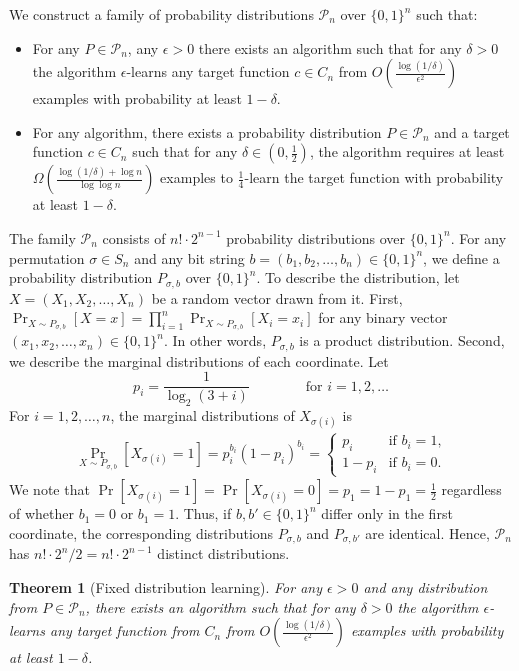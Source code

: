 \documentclass[12pt]{article}
\newtheorem{theorem}[proposition]{Theorem}
\renewcommand{\P}{\mathcal{P}}
\begin{document}
We construct a family of probability distributions $\P_n$ over $\{0,1\}^n$ such that:
\begin{itemize}
\item For any $P \in \P_n$, any $\epsilon > 0$ there exists an algorithm such
that for any $\delta > 0$ the algorithm $\epsilon$-learns any target function $c
\in C_n$ from $O \left( \frac{\log(1/\delta)}{\epsilon^2} \right)$ examples with
probability at least $1-\delta$.

\item For any algorithm, there exists
a probability distribution $P \in \P_n$ and a target function $c \in C_n$
such that for any $\delta \in (0,\frac{1}{2})$, the algorithm requires
at least $\Omega(\frac{\log(1/\delta) + \log n}{\log \log n})$ examples to
$\frac{1}{4}$-learn the target function with probability at least $1-\delta$.
\end{itemize}

The family $\P_n$ consists of $n! \cdot 2^{n-1}$ probability distributions over
$\{0,1\}^n$. For any permutation $\sigma \in S_n$ and any bit string $b = (b_1,
b_2,\dots, b_n) \in \{0,1\}^n$, we define a probability distribution
$P_{\sigma,b}$ over $\{0,1\}^n$. To describe the distribution, let $X = (X_1,
X_2, \dots, X_n)$ be a random vector drawn from it. First, $\Pr_{X \sim
P_{\sigma,b}}[X = x] = \prod_{i=1}^n \Pr_{X \sim P_{\sigma,b}}[X_i = x_i]$ for
any binary vector $(x_1, x_2, \dots, x_n) \in \{0,1\}^n$. In other words,
$P_{\sigma,b}$ is a product distribution. Second, we describe the marginal
distributions of each coordinate. Let
$$
p_i = \frac{1}{\log_2(3 + i)} \qquad \qquad \text{for $i=1,2,\dots$}
$$
For $i=1,2,\dots,n$, the marginal distributions of $X_{\sigma(i)}$ is
\begin{align*}
\Pr_{X \sim P_{\sigma,b}}[X_{\sigma(i)} = 1] = p_i^{b_i} (1 - p_i)^{b_i} =
\begin{cases}
p_i & \text{if $b_i = 1$,} \\
1 - p_i & \text{if $b_i = 0$.}
\end{cases}
\end{align*}
We note that $\Pr[X_{\sigma(i)} = 1] = \Pr[X_{\sigma(i)} = 0] = p_1 = 1 - p_1 =
\frac{1}{2}$ regardless of whether $b_1 = 0$ or $b_1 = 1$. Thus, if $b,b' \in \{0,1\}^n$
differ only in the first coordinate, the corresponding distributions $P_{\sigma,b}$
and $P_{\sigma,b'}$ are identical. Hence, $\P_n$ has $n! \cdot 2^n / 2 = n! \cdot 2^{n-1}$
distinct distributions.

\begin{theorem}[Fixed distribution learning]
For any $\epsilon > 0$ and any distribution from $P \in \P_n$,
there exists an algorithm such that for any $\delta > 0$
the algorithm $\epsilon$-learns any target function
from $C_n$ from $O \left( \frac{\log(1/\delta)}{\epsilon^2} \right)$
examples with probability at least $1 - \delta$.
\end{theorem}
\end{document}
